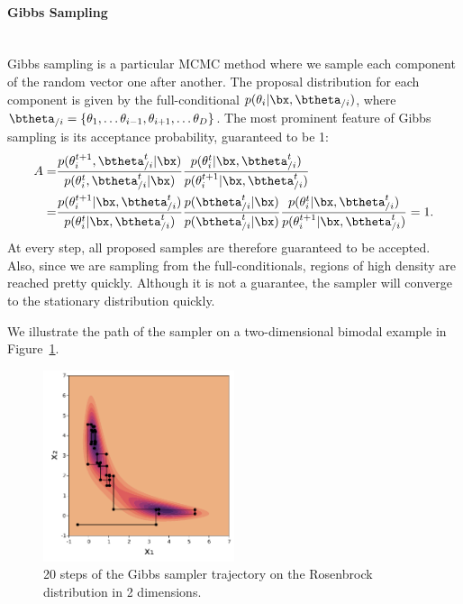 \paragraph{Gibbs Sampling}\mbox{}\\
Gibbs sampling is a particular \ac{MCMC} method where we sample each component of the random vector one after another.
The proposal distribution for each component is given by the full-conditional  $p(\theta_i|\bx,\btheta_{/i})$, where $\btheta_{/i}=\{\theta_1, \ldots \theta_{i-1}, \theta_{i+1},\ldots \theta_{D}\}$.
The most prominent feature of Gibbs sampling is its acceptance probability, guaranteed to be 1:
\begin{align*}
    A =& \frac{p(\theta^{t+1}_i,\btheta^t_{/i}|\bx)}{p(\theta^t_i,\btheta^t_{/i}|\bx)}\frac{p(\theta^t_i|\bx,\btheta^{t}_{/i})}{p(\theta^{t+1}_i|\bx,\btheta^t_{/i})}\\
    =& \frac{p(\theta^{t+1}_i|\bx, \btheta^{t}_{/i})}{p(\theta^t_i|\bx,\btheta^t_{/i})}\frac{p(\btheta^t_{/i}|\bx)}{p(\btheta^t_{/i}|\bx)}\frac{p(\theta^t_i|\bx,\btheta^{t}_{/i})}{p(\theta^{t+1}_i|\bx,\btheta^t_{/i})} = 1.
\end{align*}
At every step, all proposed samples are therefore guaranteed to be accepted.
Also, since we are sampling from the full-conditionals, regions of high density are reached pretty quickly.
Although it is not a guarantee, the sampler will converge to the stationary distribution quickly.

We illustrate the path of the sampler on a two-dimensional bimodal example in Figure~\ref{fig:gibbs_samp}.

\begin{figure}
\centering
\includegraphics[width=0.5\textwidth]{./chapters/2_background/figures/gibbs_sampling.pdf}
\caption{20 steps of the Gibbs sampler trajectory on the Rosenbrock distribution in 2 dimensions.}
\label{fig:gibbs_samp}
\end{figure}

